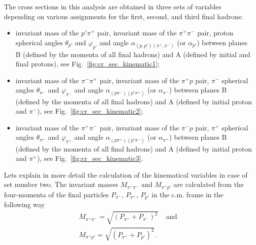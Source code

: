 The cross sections in this analysis are obtained in three sets of variables depending on
various assignments for the first, second, and
third final hadrons:
\begin{itemize}
\item invariant mass of the $p'\pi^{+}$ pair, invariant mass of the $\pi^{+}\pi^{-}$
pair, proton spherical angles $\theta_{p'}$ and $\varphi_{p'}$ and 
angle $\alpha_{(p,p')(\pi^{+},\pi^{-})}$ (or $\alpha_{p'}$) 
between planes B (defined by the momenta of
all final hadrons) and A  (defined by
initial and final protons), see Fig.~\ref{fig:cr_sec_kinematic1};
\item invariant mass of the $\pi^{-}\pi^{+}$
pair, invariant mass of the $\pi^{+}p$
pair, $\pi^{-}$ spherical angles
$\theta_{\pi^{-}}$ and $\varphi_{\pi^{-}}$
and angle 
$\alpha_{(p\pi^{-})(p'\pi^{+})}$ (or $\alpha_{\pi^{-}}$)
between planes B (defined by the momenta of
all final hadrons) and A  (defined by
initial proton and $\pi^{-}$), see Fig.~\ref{fig:cr_sec_kinematic2};
\item invariant mass of the $\pi^{+}\pi^{-}$
pair, invariant mass of the $\pi^{-}p$
pair, $\pi^{+}$ spherical angles
$\theta_{\pi^{+}}$ and $\varphi_{\pi^{+}}$
and angle
$\alpha_{(p\pi^{+})(p'\pi^{-})}$ (or $\alpha_{\pi^{+}}$)
between planes B (defined by the momenta of
all final hadrons) and A  (defined by
initial proton and $\pi^{+}$), see Fig.~\ref{fig:cr_sec_kinematic3}.
\end{itemize}


Lets explain in more detail the calculation of the kinematical variables in case of set number two.  The invariant masses $
M_{\pi^{+}\pi^{-}}$ and $M_{\pi^{+}p'}$
  are calculated from the four-momenta of the final 
particles $P_{\pi^{-}}$, $P_{\pi^{+}}$, $P_{p'}$ in the c.m. frame in the following way
\begin{equation}
\begin{aligned}
M_{\pi^{+}\pi^{-}} = \sqrt{(P_{\pi^{+}} + P_{\pi^{-}})^{2}} & \text{  and}\\ \label{invmasses}
M_{\pi^{+}p'} = \sqrt{(P_{\pi^{+}} + P_{p'})^{2}}. & \\ 
\end{aligned}  
\end{equation}  

